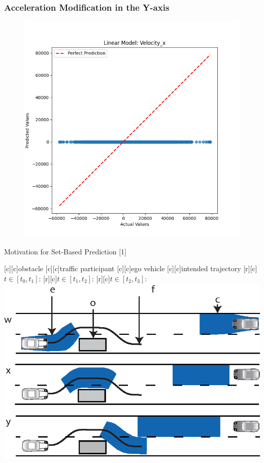 \begin{frame}
  \frametitle{Acceleration Modification in the Y-axis}
  \begin{figure}
    \centering
    \includegraphics[width=0.5 \textwidth]{figures/acceleration_mod/acceleration_mod_vel_x.png}
  \end{figure}
\end{frame}




\begin{frame}{Motivation for Set-Based Prediction $[$1$]$}

	\centering	
	\footnotesize
      [c][c]{obstacle}						
      [c][c]{traffic participant}
      [c][c]{ego vehicle}
      [c][c]{intended trajectory}      
      [r][c]{$t \in [t_0, t_1]$:}
      [r][c]{$t \in [t_1, t_2]$:}
      [r][c]{$t \in [t_2, t_3]$:}
      \includegraphics[width=0.8\columnwidth, height=0.74\textheight, keepaspectratio]{./figures/snapshots_blue.eps}
\end{frame}


